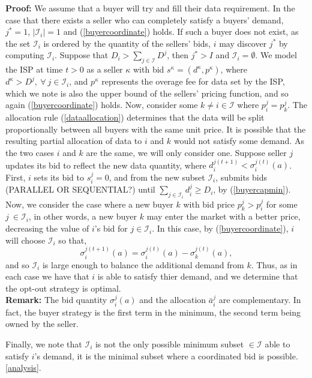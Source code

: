 \documentclass[12pt]{article}
\theoremstyle{definition}
\newcommand{\mcI}{\mathcal{I}}
\newcommand{\g}{\sigma}
\begin{document}
\begin{multicols}{2}
\textbf{Proof:}
We assume that a buyer will try and fill their data requirement.
In the case that there exists a seller who can completely satisfy a buyers'
demand, $j^*=1$, $\vert \mcI_i\vert =1$ and (\ref{buyercoordinate}) holds. If such a buyer does not exist,
as the set $\mcI_i$ is ordered by the quantity of the sellers' bids, $i$ may discover 
$j^*$ by computing $\mcI_i$.
Suppose that $D_i >
\sum_{j\in\mcI}D^j$, then $j^* > I$ and $\mcI_i = \emptyset$. 
We model the ISP at time $t>0$ as a seller $\kappa$ with bid $s^\kappa =(d^\kappa, p^\kappa)$,
where $d^\kappa > D^j, \
\forall \ j\in\mcI_i$, and
$p^\kappa$ represents the overage fee for data set by the ISP, which we note is also the upper bound of the sellers'
pricing function, and so again (\ref{buyercoordinate}) holds.
Now, consider some $k \ne i \in \mcI$ where $p_i^j = p_k^j$. 
The allocation rule (\ref{dataallocation}) determines that the data will be
split proportionally
between all buyers with the same unit price. 
It is possible that the resulting partial allocation of data to $i$ and $k$
would not satisfy some demand. As the two cases $i$ and $k$ are the same, we
will only consider one. Suppose seller $j$ updates its
bid to reflect the new data quantity, where
$d_i^{j(t+1)} < \g_i^{j(t)}(a)$. First, $i$ sets its bid to $s_i^j = 0$, and
from the new subset $\mcI_i$, submits bids (PARALLEL OR SEQUENTIAL?) until
$\sum_{j\in\mcI_i} d_i^j \ge D_i$, by (\ref{buyercapmin}).
Now, we consider the case where a new buyer $k$ with bid
price $p_k^j > p_i^j$ for some $j \ \in \mcI_i$, in other
words, a new buyer $k$ may enter the market with a better price, decreasing the
value of $i$'s bid for $j\in\mcI_i$. In this case, by (\ref{buyercoordinate}),
$i$ will choose $\mcI_i$ so that,
$$
    \g_i^{j(t+1)}(a) = \g_i^{j(t)}(a) - \g_k^{j(t)}(a),
$$
and so $\mcI_i$ is large enough to balance the additional demand from
$k$. Thus, as in each case we have that $i$ is able to satisfy thier demand,
and we determine that the opt-out strategy is optimal.\\
\textbf{Remark:} The bid quantity $\g_i^j(a)$ and the allocation $\bar{a}_i^j$
are complementary. In fact, the buyer strategy is the first term in the
minimum, the second term being owned by the seller.

Finally, we note that $\mcI_i$ is not the only
possible minimum subset $\in\mcI$ able to satisfy $i$'s demand, it is the
minimal subset where a coordinated bid is possible.
\ref{analysis}. 


\end{multicols}
\end{document}
